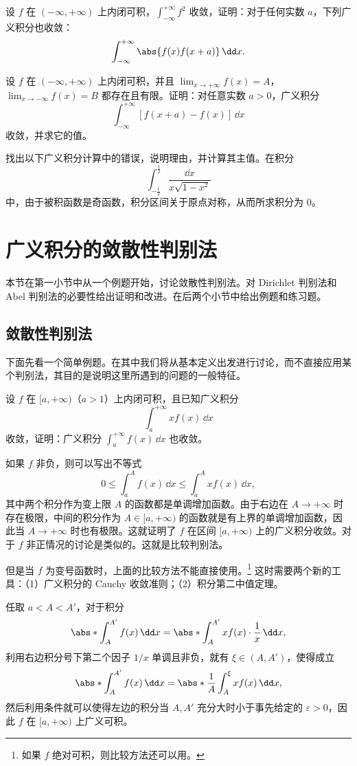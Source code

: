 \begin{xexercise}[4]
设 $f$ 在 $(-\infty,+\infty)$ 上内闭可积，$\int_{-\infty}^{+\infty}f^2$ 收敛，证明：对于任何实数 $a$，下列广义积分也收敛：
  \[
    \int_{-\infty}^{+\infty}\abs{f(x)f(x+a)}\,\dd x.
  \]
\end{xexercise}

\begin{xexercise}[5]
设 $f$ 在 $(-\infty,+\infty)$ 上内闭可积，并且 $\lim_{x\to+\infty}f(x)=A$，$\lim_{x\to-\infty}f(x)=B$ 都存在且有限。证明：对任意实数 $a>0$，广义积分
  \[
    \int_{-\infty}^{+\infty}[f(x+a)-f(x)]\,\dd x
  \]
  收敛，并求它的值。
\end{xexercise}

\begin{xexercise}[6]
找出以下广义积分计算中的错误，说明理由，并计算其主值。在积分
  \[
    \int_{-\frac12}^{\frac12}\frac{\dd x}{x\sqrt{1-x^2}}
  \]
  中，由于被积函数是奇函数，积分区间关于原点对称，从而所求积分为 0。
\end{xexercise}

\section{广义积分的敛散性判别法}

本节在第一小节中从一个例题开始，讨论敛散性判别法。对 Dirichlet 判别法和 Abel 判别法的必要性给出证明和改进。在后两个小节中给出例题和练习题。

\subsection{敛散性判别法}

下面先看一个简单例题。在其中我们将从基本定义出发进行讨论，而不直接应用某个判别法，其目的是说明这里所遇到的问题的一般特征。

\begin{xexample}[12.2.1]
设 $f$ 在 $[a,+\infty)$（$a>1$）上内闭可积，且已知广义积分
\[
  \int_a^{+\infty}x f(x)\,\dd x
\]
收敛，证明：广义积分 $\int_a^{+\infty}f(x)\,\dd x$ 也收敛。
\end{xexample}
\begin{xproof}
如果 $f$ 非负，则可以写出不等式
\[
  0\leq\int_a^A f(x)\,\dd x\leq\int_a^A x f(x)\,\dd x,
\]
其中两个积分作为变上限 $A$ 的函数都是单调增加函数。由于右边在 $A\to+\infty$ 时存在极限，中间的积分作为 $A\in[a,+\infty)$ 的函数就是有上界的单调增加函数，因此当 $A\to+\infty$ 时也有极限。这就证明了 $f$ 在区间 $[a,+\infty)$ 上的广义积分收敛。对于 $f$ 非正情况的讨论是类似的。这就是比较判别法。

但是当 $f$ 为变号函数时，上面的比较方法不能直接使用。\footnote{如果 $f$ 绝对可积，则比较方法还可以用。} 这时需要两个新的工具：（1）广义积分的 Cauchy 收敛准则；（2）积分第二中值定理。

任取 $a<A<A'$，对于积分
\[
  \abs*{\int_A^{A'}f(x)\,\dd x}
  =\abs*{\int_A^{A'}xf(x)\cdot\frac1x\,\dd x},
\]
利用右边积分号下第二个因子 $1/x$ 单调且非负，就有 $\xi\in(A,A')$，使得成立
\[
  \abs*{\int_A^{A'}f(x)\,\dd x}
  =\abs*{\frac1A\int_A^\xi x f(x)\,\dd x},
\]
然后利用条件就可以使得左边的积分当 $A,A'$ 充分大时小于事先给定的 $\varepsilon>0$，因此 $f$ 在 $[a,+\infty)$ 上广义可积。
\end{xproof}

